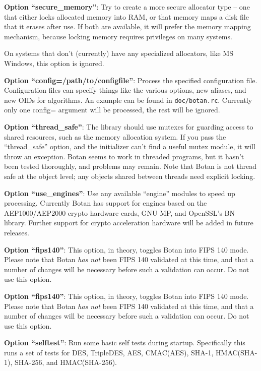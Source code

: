 \documentclass{article}
\newcommand{\filename}[1]{\texttt{#1}}
\begin{document}
\noindent
\textbf{Option ``secure\_memory''}: Try to create a more secure allocator type
-- one that either locks allocated memory into RAM, or that memory maps a disk
file that it erases after use. If both are available, it will prefer the memory
mapping mechanism, because locking memory requires privileges on many systems.

On systems that don't (currently) have any specialized allocators, like
MS Windows, this option is ignored.

\noindent
\textbf{Option ``config=/path/to/configfile''}: Process the specified
configuration file. Configuration files can specify things like the various
options, new aliases, and new OIDs for algorithms. An example can be found in
\filename{doc/botan.rc}. Currently only one config= argument will be processed,
the rest will be ignored.

\noindent
\textbf{Option ``thread\_safe''}: The library should use mutexes for guarding
access to shared resources, such as the memory allocation system. If you pass
the ``thread\_safe'' option, and the initializer can't find a useful mutex
module, it will throw an exception. Botan seems to work in threaded programs,
but it hasn't been tested thoroughly, and problems may remain. Note that Botan
is not thread safe at the object level; any objects shared between threads need
explicit locking.

\noindent
\textbf{Option ``use\_engines''}: Use any available ``engine'' modules to speed
up processing. Currently Botan has support for engines based on the
AEP1000/AEP2000 crypto hardware cards, GNU MP, and OpenSSL's BN
library. Further support for crypto acceleration hardware will be added in
future releases.

\noindent
\textbf{Option ``fips140''}: This option, in theory, toggles Botan into FIPS
140 mode. Please note that Botan \emph{has not} been FIPS 140 validated at this
time, and that a number of changes will be necessary before such a validation
can occur. Do not use this option.

\noindent
\textbf{Option ``fips140''}: This option, in theory, toggles Botan into FIPS
140 mode. Please note that Botan \emph{has not} been FIPS 140 validated at this
time, and that a number of changes will be necessary before such a validation
can occur. Do not use this option.

\noindent
\textbf{Option ``selftest''}: Run some basic self tests during
startup.  Specifically this runs a set of tests for DES, TripleDES,
AES, CMAC(AES), SHA-1, HMAC(SHA-1), SHA-256, and HMAC(SHA-256).
\end{document}

